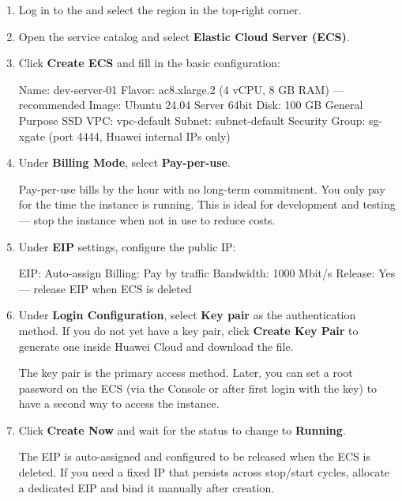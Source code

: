 \documentclass{guide}
\begin{document}
\stepbystep
\begin{enumerate}
  \item Log in to the  and select the  region in the top-right
        corner.

  \item Open the service catalog and select \textbf{Elastic Cloud Server
        (ECS)}.

  \item Click \textbf{Create ECS} and fill in the basic configuration:

  \begin{code}
Name:           dev-server-01
Flavor:         ac8.xlarge.2 (4 vCPU, 8 GB RAM) — recommended
Image:          Ubuntu 24.04 Server 64bit
Disk:           100 GB General Purpose SSD
VPC:            vpc-default
Subnet:         subnet-default
Security Group: sg-xgate (port 4444, Huawei internal IPs only)
  \end{code}

  \item Under \textbf{Billing Mode}, select \textbf{Pay-per-use}.

  \begin{tip}
  Pay-per-use bills by the hour with no long-term commitment. You only pay
  for the time the instance is running. This is ideal for development and
  testing --- stop the instance when not in use to reduce costs.
  \end{tip}

  \item Under \textbf{EIP} settings, configure the public IP:

  \begin{code}
EIP:            Auto-assign
Billing:        Pay by traffic
Bandwidth:      1000 Mbit/s
Release:        Yes — release EIP when ECS is deleted
  \end{code}

  \item Under \textbf{Login Configuration}, select \textbf{Key pair} as the
        authentication method. If you do not yet have a key pair, click
        \textbf{Create Key Pair} to generate one inside Huawei Cloud and
        download the  file.

  \begin{infobox}
  The key pair is the primary access method. Later, you can set a root
  password on the ECS (via the Console or after first login with the key)
  to have a second way to access the instance.
  \end{infobox}

  \item Click \textbf{Create Now} and wait for the status to change to
        \textbf{Running}.

  \begin{warning}
  The EIP is auto-assigned and configured to be released when the ECS is
  deleted. If you need a fixed IP that persists across stop/start cycles,
  allocate a dedicated EIP and bind it manually after creation.
  \end{warning}
\end{enumerate}
\end{document}
